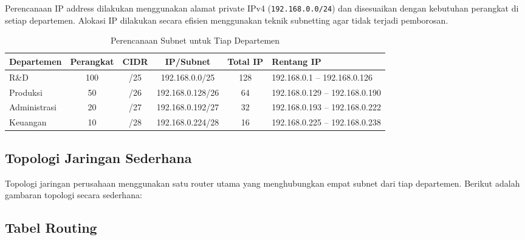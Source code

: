 Perencanaan IP address dilakukan menggunakan alamat private IPv4 (\texttt{192.168.0.0/24}) dan disesuaikan dengan kebutuhan perangkat di setiap departemen. Alokasi IP dilakukan secara efisien menggunakan teknik subnetting agar tidak terjadi pemborosan.

\begin{table}[H]
\centering
\caption{Perencanaan Subnet untuk Tiap Departemen}
\begin{tabular}{|l|c|c|c|c|l|}
\hline
\textbf{Departemen} & \textbf{Perangkat} & \textbf{CIDR} & \textbf{IP/Subnet} & \textbf{Total IP} & \textbf{Rentang IP} \\
\hline
R\&D & 100 & /25 & 192.168.0.0/25 & 128 & 192.168.0.1 -- 192.168.0.126 \\
Produksi & 50 & /26 & 192.168.0.128/26 & 64 & 192.168.0.129 -- 192.168.0.190 \\
Administrasi & 20 & /27 & 192.168.0.192/27 & 32 & 192.168.0.193 -- 192.168.0.222 \\
Keuangan & 10 & /28 & 192.168.0.224/28 & 16 & 192.168.0.225 -- 192.168.0.238 \\
\hline
\end{tabular}
\end{table}

\subsection{Topologi Jaringan Sederhana}

Topologi jaringan perusahaan menggunakan satu router utama yang menghubungkan empat subnet dari tiap departemen. Berikut adalah gambaran topologi secara sederhana:

\begin{center}
\end{center}


\subsection{Tabel Routing}

